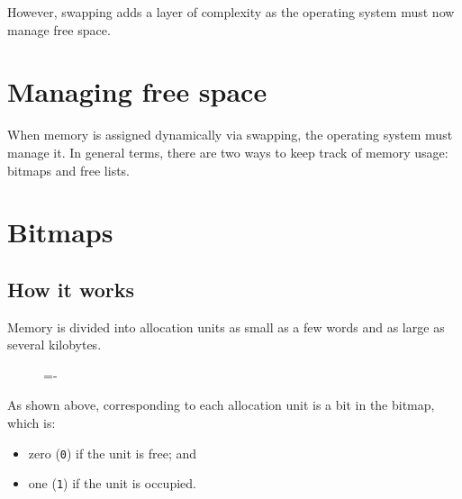 \documentclass[a4paper]{systems-software}
\begin{document}
However, swapping adds a layer of complexity as the operating system must now manage free space.


\section{Managing free space}

When memory is assigned dynamically via swapping, the operating system must manage it. In general terms, there are two ways to keep track of memory usage: bitmaps and free lists.


\section*{Bitmaps}

\subsection*{How it works}

Memory is divided into allocation units as small as a few words and as large as several kilobytes.

\begin{figure}[H]
  \lineskip=-\fboxrule
\end{figure}

As shown above, corresponding to each allocation unit is a bit in the bitmap, which is:
\begin{itemize}
	\item zero (\texttt{0}) if the unit is free; and
	\item one (\texttt{1}) if the unit is occupied.
\end{itemize}
\end{document}
